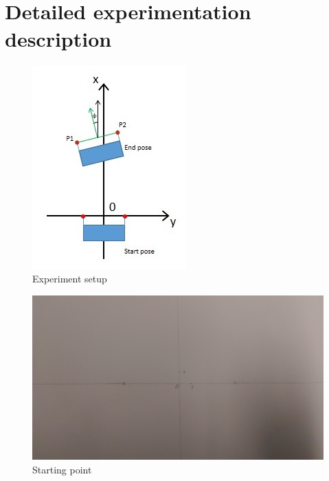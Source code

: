 \documentclass[paper=a4, fontsize=11pt]{scrartcl} %
\title{\hmwkClass \\
       \hmwkTitle}
\author{\hmwkAuthorFullName}
\date{\hmwkDueDate}
\begin{document}
    \maketitle
    \thispagestyle{fancy} %

    \section{Detailed experimentation description}

    \begin{figure}[h!]
        \centering
        \includegraphics[width=0.6\linewidth]{images/Img1}
        \caption{Experiment setup}
        \label{fig:img1}
    \end{figure}
        
    \begin{figure}[h!]
        \centering
        \includegraphics[width=0.9\linewidth]{images/IMAG0144}
        \caption{Starting point}
        \label{fig:img2}
    \end{figure}
    
\end{document}
